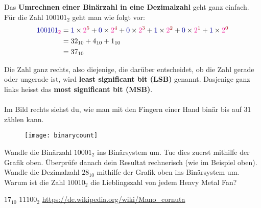 Das \textbf{Umrechnen einer Binärzahl in eine Dezimalzahl} geht ganz einfach. Für die Zahl $100101_2$ geht man wie folgt vor:
\begin{align}\begin{split}
	\label{equ binaerzahl in basis und nennwerten}
	\textcolor{blue}{100101}_{\textcolor{magenta}{2}}
	&= \textcolor{blue}{1} \times \textcolor{magenta}{2}^{\textcolor{red}{5}}
	 + \textcolor{blue}{0} \times \textcolor{magenta}{2}^{\textcolor{red}{4}}
	 + \textcolor{blue}{0} \times \textcolor{magenta}{2}^{\textcolor{red}{3}}
	 + \textcolor{blue}{1} \times \textcolor{magenta}{2}^{\textcolor{red}{2}}
	 + \textcolor{blue}{0} \times \textcolor{magenta}{2}^{\textcolor{red}{1}}
	 + \textcolor{blue}{1} \times \textcolor{magenta}{2}^{\textcolor{red}{0}}
	\\
	&= 32_{10} + 4_{10} + 1_{10}
	\\
	&= 37_{10}		
\end{split}\end{align}

\begin{minipage}[t]{\textwidth}
\begin{minipage}[t]{0.48\textwidth}
	Die Zahl ganz rechts, also diejenige, die darüber entscheidet, ob die Zahl gerade oder ungerade ist, wird \textbf{least significant bit (LSB)} genannt. Dasjenige ganz links heisst das \textbf{most significant bit (MSB)}.
	\\ \\
	Im Bild rechts siehst du, wie man mit den Fingern einer Hand binär bis auf $31$ zählen kann.
\end{minipage}
\hfill
\begin{minipage}[t]{0.48\textwidth}
	\begin{figure}[H]
		\vspace{-0.7cm}
		\centering
		\texttt{[image: binarycount]}
	\end{figure}
\end{minipage}
\end{minipage}

\begin{question}
	\begin{tasks}
		\task Wandle die Binärzahl $10001_2$ ins Binärsystem um. Tue dies zuerst mithilfe der Grafik oben. Überprüfe danach dein Resultat rechnerisch (wie im Beispiel oben). 
		\task Wandle die Dezimalzahl $28_{10}$ mithilfe der Grafik oben ins Binärsystem um. 
		\task Warum ist die Zahl $10010_2$ die Lieblingszahl von jedem Heavy Metal Fan? 
	\end{tasks}
\end{question}
\begin{solution}
	\begin{tasks}
		\task $17_{10}$
		\task $11100_2$
		\task \url{https://de.wikipedia.org/wiki/Mano_cornuta}
	\end{tasks}
\end{solution}

